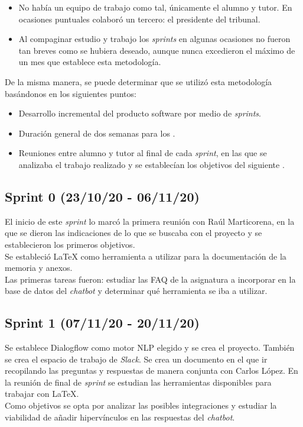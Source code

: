 	\begin{itemize}
	\tightlist
	\item
	No había un equipo de trabajo como tal, únicamente el alumno y tutor. En ocasiones puntuales colaboró un tercero: el presidente del tribunal. 
	\item
	 Al compaginar estudio y trabajo los \textit{sprints} en algunas ocasiones no fueron tan breves como se hubiera deseado, aunque nunca excedieron el máximo de un mes que establece esta metodología.
	\end{itemize}

De la misma manera, se puede determinar que se utilizó esta metodología basándonos en los siguientes puntos:
	\begin{itemize}
	\tightlist
	\item
	Desarrollo incremental del producto software por medio de \textit{sprints}.
	\item
	Duración general de dos semanas para los .
	\item
	Reuniones entre alumno y tutor al final de cada \textit{sprint}, en las que se analizaba el trabajo realizado y se establecían los objetivos del siguiente .
	\end{itemize}


\subsection{Sprint 0 (23/10/20 - 06/11/20)}

El inicio de este \textit{sprint} lo marcó la primera reunión con Raúl Marticorena, en la que se dieron las indicaciones de lo que se buscaba con el proyecto y se establecieron los primeros objetivos.\\
Se estableció LaTeX como herramienta a utilizar para la documentación de la memoria y anexos.\\
Las primeras tareas fueron: estudiar las FAQ de la asignatura a incorporar en la base de datos del \textit{chatbot} y determinar qué herramienta se iba a utilizar. 


\subsection{Sprint 1 (07/11/20 - 20/11/20)}

Se establece Dialogflow como motor NLP elegido y se crea el proyecto. También se crea el espacio de trabajo de \textit{Slack}.
Se crea un documento en el que ir recopilando las preguntas y respuestas de manera conjunta con Carlos López. 
En la reunión de final de \textit{sprint} se estudian las herramientas disponibles para trabajar con LaTeX.\\
Como objetivos se opta por analizar las posibles integraciones y estudiar la viabilidad de añadir hipervínculos en las respuestas del \textit{chatbot}.

